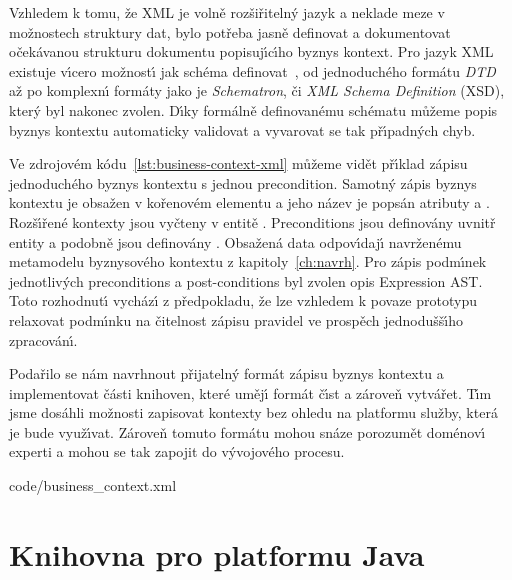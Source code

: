 Vzhledem k tomu, že \gls{XML} je volně rozšiřiteln\'y jazyk a neklade
meze v možnostech struktury dat, bylo potřeba jasně definovat
a dokumentovat očekávanou strukturu dokumentu popisuj\'{\i}c\'{\i}ho
byznys kontext. Pro jazyk \gls{XML} existuje v\'{\i}cero možnost\'{\i} jak schéma
definovat~\cite{lee2000comparative}, od jednoduchého formátu
\textit{DTD} až po komplexn\'{\i} formáty jako je \textit{Schematron}, či
\textit{XML Schema Definition} (\gls{XSD}), kter\'y byl nakonec zvolen.
D\'{\i}ky formálně definovanému schématu můžeme popis byznys kontextu
automaticky validovat a vyvarovat se tak př\'{\i}padn\'ych chyb.

Ve zdrojovém kódu~\ref{lst:business-context-xml} můžeme vidět
př\'{\i}klad zápisu jednoduchého byznys kontextu s jednou precondition.
Samotn\'y zápis byznys kontextu je obsažen v kořenovém elementu
 a jeho název je popsán atributy
 a . Rozš\'{\i}řené kontexty jsou vyčteny
v entitě . Preconditions jsou
definovány uvnitř entity  a podobně
jsou definovány . Obsažená data odpov\'{\i}daj\'{\i}
navrženému metamodelu byznysového kontextu z kapitoly~\ref{ch:navrh}.
Pro zápis podm\'{\i}nek jednotliv\'ych preconditions a post-conditions byl zvolen
opis Expression \gls{AST}. Toto rozhodnut\'{\i} vycház\'{\i} z předpokladu,
že lze vzhledem k povaze prototypu relaxovat podm\'{\i}nku
na čitelnost zápisu pravidel ve prospěch jednodušš\'{\i}ho zpracován\'{\i}.

Podařilo se nám navrhnout přijateln\'y formát zápisu byznys kontextu
a implementovat části knihoven, které uměj\'{\i} formát č\'{\i}st a zároveň vytvářet.
T\'{\i}m jsme dosáhli možnosti zapisovat kontexty bez ohledu na platformu
služby, která je bude využ\'{\i}vat. Zároveň tomuto formátu mohou
snáze porozumět doménov\'{\i} experti a mohou se tak zapojit do
v\'yvojového procesu.


{code/business_context.xml}

\section{Knihovna pro platformu Java}

